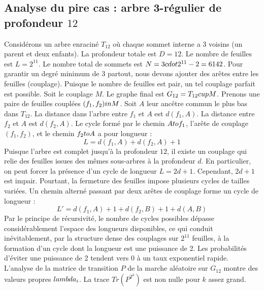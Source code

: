 \documentclass[12pt,a4paper]{article}
\begin{document}
\subsection{Analyse du pire cas : arbre 3-r\'egulier de profondeur $12$}
Consid\'erons un arbre enracin\'e $T_{12}$ o\`u chaque sommet interne a 3 voisins (un parent et deux enfants).
La profondeur totale est $D = 12$.
Le nombre de feuilles est $L = 2^{11}$.
Le nombre total de sommets est $N = 3 \\cdot 2^{11} - 2 = 6142$.
Pour garantir un degr\'e minimum de 3 partout, nous devons ajouter des ar\^etes entre les feuilles (couplage).
Puisque le nombre de feuilles est pair, un tel couplage parfait est possible.
Soit le couplage $M$. Le graphe final est $G_{12} = T_{12} \\cup M$.
Prenons une paire de feuilles coupl\'ees $(f_1, f_2) \\in M$.
Soit $A$ leur anc\^etre commun le plus bas dans $T_{12}$.
La distance dans l'arbre entre $f_1$ et $A$ est $d(f_1, A)$.
La distance entre $f_2$ et $A$ est $d(f_2, A)$.
Le cycle form\'e par le chemin $A \\to f_1$, l'ar\^ete de couplage $(f_1, f_2)$, et le chemin $f_2 \\to A$ a pour longueur :
$$ L = d(f_1, A) + d(f_2, A) + 1 $$
Puisque l'arbre est complet jusqu'\`a la profondeur $12$, il existe un couplage qui relie des feuilles issues des m\^emes sous-arbres \`a la profondeur $d$.
En particulier, on peut forcer la pr\'esence d'un cycle de longueur $L = 2d + 1$. Cependant, $2d+1$ est impair.
Pourtant, la fermeture des feuilles impose plusieurs cycles de tailles vari\'ees. Un chemin altern\'e passant par deux ar\^etes de couplage forme un cycle de longueur :
$$ L' = d(f_1, A) + 1 + d(f_2, B) + 1 + d(A, B) $$
Par le principe de r\'ecursivit\'e, le nombre de cycles possibles d\'epasse consid\'erablement l'espace des longueurs disponibles, ce qui conduit in\'evitablement, par la structure dense des couplages sur $2^{11}$ feuilles, \`a la formation d'un cycle dont la longueur est une puissance de 2. Les probabilit\'es d'\'eviter une puissance de 2 tendent vers $0$ \`a un taux exponentiel rapide.
L'analyse de la matrice de transition $P$ de la marche al\'eatoire sur $G_{12}$ montre des valeurs propres $\\lambda_i$. La trace $Tr(P^{2^k})$ est non nulle pour $k$ assez grand.
\end{document}
